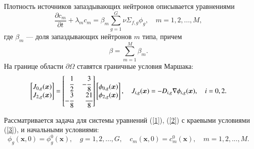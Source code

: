 \documentclass{crm-article}
\begin{document}
Плотность источников запаздывающих нейтронов описывается уравнениями
\begin{equation}\label{2}
 \frac{\partial c_m}{\partial t} + \lambda_m c_m = \beta_m \sum_{g=1}^{G} \nu \Sigma_{f,g} \phi_g,
 \quad m = 1,2, ..., M, 
\end{equation}
где $\beta_m$ --- доля запаздывающих нейтронов $m$ типа, причем
\[
 \beta = \sum_{m=1}^{M} \beta_m.
\] 
На границе области $\partial \Omega$ ставятся граничные условия Маршака:
\begin{equation}\label{3}
\begin{split}
\begin{bmatrix}
J_{0,g}(\bm x)\\
J_{2,g}(\bm x)\\
\end{bmatrix}
=
\begin{bmatrix}
\phantom{-}\cfrac{1}{2} & -\cfrac{3}{8} \\
 -\cfrac{3}{8} & \phantom{-}\cfrac{21}{8} \\
\end{bmatrix}
\begin{bmatrix}
\phi_{0,g}(\bm x) \\
\phi_{2,g}(\bm x) \\
\end{bmatrix},
\quad
J_{i,g}(\bm x) = -D_{i,g}\nabla\phi_{i,g}(\bm x), 
\quad
i = 0, 2.
\end{split}
\end{equation}

Рассматривается задача для системы уравнений (\ref{1}), (\ref{2}) с краевыми условиями (\ref{3}), и начальными условиями:
\begin{equation}\label{4}
 \phi_g(\bm x,0) = \phi_g^0(\bm x), 
  \quad  g = 1,2, ..., G ,
 \quad   c_m(\bm x,0) = c_m^0(\bm x), 
  \quad  m = 1,2, ..., M.
\end{equation}
\end{document}
